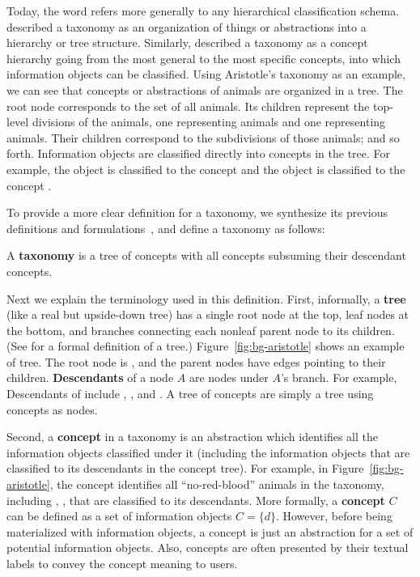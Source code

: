 Today, the word  refers more generally to any hierarchical classification schema. \citet{tunkelang2009faceted} described a taxonomy as an organization of things or abstractions into a hierarchy or tree structure. Similarly, \citet{sacco2009dynamic} described a taxonomy as a concept hierarchy going from the most general to the most specific concepts, into which information objects can be classified. Using Aristotle's taxonomy as an example, we can see that concepts or abstractions of animals are organized in a tree. The root node  corresponds to the set of all animals. Its children represent the top-level divisions of the animals, one representing  animals and one representing  animals. Their children correspond to the subdivisions of those animals; and so forth. Information objects are classified directly into concepts in the tree. For example, the object  is classified to the concept  and the 
object  is classified to the concept . 

To provide a more clear definition for a taxonomy, we synthesize its previous definitions and formulations~\cite{sacco2009dynamic, tzitzikas2005compound}, and define a taxonomy as follows:
\begin{definition}
\label{def:taxonomy}
A \textbf{taxonomy} is a tree of concepts with all concepts subsuming their descendant concepts.
\end{definition}
\noindent Next we explain the terminology used in this definition. First, informally, a \textbf{tree} (like a real but upside-down tree) has a single root node at the top, leaf nodes at the bottom, and branches connecting each nonleaf parent node to its children. (See \citet{garnier2009discrete} for a formal definition of a tree.) Figure~\ref{fig:bg-aristotle} shows an example of tree. The root node is , and the parent nodes have edges pointing to their children. \textbf{Descendants} of a node $A$ are nodes under $A$'s branch. For example, Descendants of  include , ,  and . A tree of concepts are simply a tree using concepts as nodes.

Second, a \textbf{concept} in a taxonomy is an abstraction which identifies all the information objects classified under it (including the information objects that are classified to its descendants in the concept tree). For example, in Figure~\ref{fig:bg-aristotle}, the concept  identifies all ``no-red-blood'' animals in the taxonomy, including , ,  that are classified to its descendants. More formally, a \textbf{concept} $C$ can be defined as a set of information objects $C=\{d\}$. However, before being materialized with information objects, a concept is just an abstraction for a set of potential information objects. Also, concepts are often presented by their textual labels to convey the concept meaning to users. 

